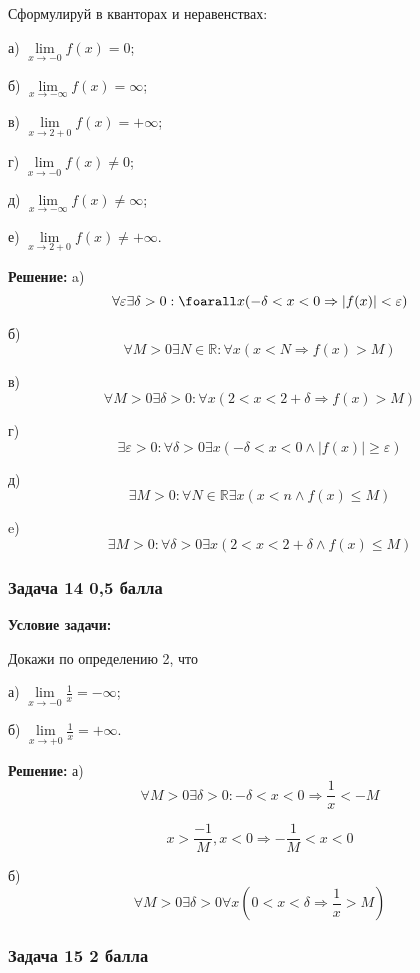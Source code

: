 \documentclass[a4paper,12pt]{article}
\begin{document}
Сформулируй в кванторах и неравенствах:

а) $\lim\limits_{x \to -0} f(x) = 0$;

б) $\lim\limits_{x \to -\infty} f(x) = \infty$;

в) $\lim\limits_{x \to 2+0} f(x) = +\infty$;

г) $\lim\limits_{x \to -0} f(x) \neq 0$;

д) $\lim\limits_{x \to -\infty} f(x) \neq \infty$;

е) $\lim\limits_{x \to 2+0} f(x) \neq +\infty$.

\textbf{Решение: }
a)
\[
\forall \varepsilon \exists \delta > 0: \foarall x(-\delta < x < 0 \Rightarrow |f(x)|<\varepsilon)
\]

б)
\[
\forall M > 0 \exists N \in \mathbb{R}: \forall x (x < N \Rightarrow f(x)>M)
\]

в)
\[
\forall M > 0 \exists \delta > 0: \forall x(2<x<2+\delta \Rightarrow f(x)>M)
\]

г)
\[
\exists \varepsilon > 0: \forall \delta > 0  \exists x(-\delta < x < 0 \land |f(x)| \ge \varepsilon)
\]

д)
\[
\exists M > 0: \forall N \in \mathbb{R} \exists x(x < n \land f(x) \le M)
\]

e)
\[
\exists M > 0: \forall \delta > 0 \exists x (2 < x < 2 + \delta \land f(x) \le M)
\]
\vspace{1cm}

\subsubsection{Задача 14 \hfill 0,5 балла}

\textbf{Условие задачи:}

Докажи по определению 2, что

а) $\lim\limits_{x \to -0} \frac{1}{x} = -\infty$;

б) $\lim\limits_{x \to +0} \frac{1}{x} = +\infty$.

\textbf{Решение: }
а)
\[
\forall M > 0 \exists \delta > 0: -\delta < x < 0 \Rightarrow \frac{1}{x} < -M
\]

\[
x > \frac{-1}{M}, x < 0 \Rightarrow -\frac{1}{M} < x < 0
\]

б)
\[
\forall M > 0 \exists \delta > 0 \forall x(0 < x < \delta \Rightarrow \frac{1}{x} > M)
\]



\vspace{1cm}

\subsubsection{Задача 15 \hfill 2 балла}
\end{document}
